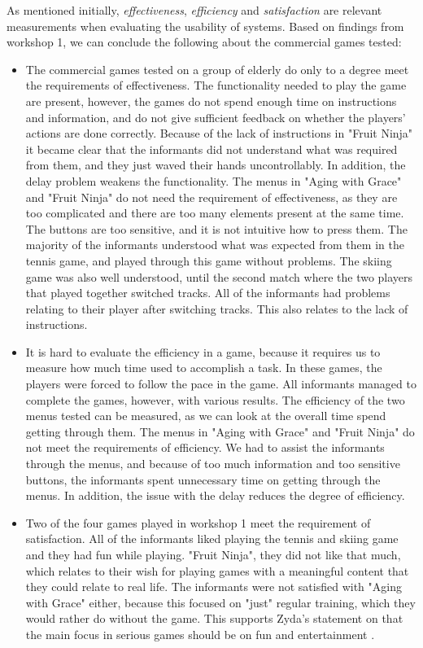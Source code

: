 As mentioned initially, \emph{effectiveness}, \emph{efficiency}  and \emph{satisfaction} are relevant measurements when evaluating the usability of systems. Based on findings from workshop 1, we can conclude the following about the commercial games tested: 
\begin{itemize}
\renewcommand{\labelitemi}{$\bullet$}
\item The commercial games tested on a group of elderly do only to a degree meet the requirements of effectiveness. The functionality needed to play the game are present, however, the games do not spend enough time on instructions and information, and do not give sufficient feedback on whether the players' actions are done correctly. Because of the lack of instructions in "Fruit Ninja" it became clear that the informants did not understand what was required from them, and they just waved their hands uncontrollably. In addition, the delay problem weakens the functionality. The menus in "Aging with Grace" and "Fruit Ninja" do not need the requirement of effectiveness, as they are too complicated and there are too many elements present at the same time. The buttons are too sensitive, and it is not intuitive how to press them. The majority of the informants understood what was expected from them in the tennis game, and played through this game without problems. The skiing game was also well understood, until the second match where the two players that played together switched tracks. All of the informants had problems relating to their player after switching tracks. This also relates to the lack of instructions.
\item It is hard to evaluate the efficiency in a game, because it requires us to measure how much time used to accomplish a task. In these games, the players were forced to follow the pace in the game. All informants managed to complete the games, however, with various results. The efficiency of the two menus tested can be measured, as we can look at the overall time spend getting through them. The menus in "Aging with Grace" and "Fruit Ninja" do not meet the requirements of efficiency. We had to assist the informants through the menus, and because of too much information and too sensitive buttons, the informants spent unnecessary time on getting through the menus. In addition, the issue with the delay reduces the degree of efficiency.
\item Two of the four games played in workshop 1 meet the requirement of satisfaction. All of the informants liked playing the tennis and skiing game and they had fun while playing. "Fruit Ninja", they did not like that much, which relates to their wish for playing games with a meaningful content that they could relate to real life. The informants were not satisfied with "Aging with Grace" either, because this focused on "just" regular training, which they would rather do without the game. This supports Zyda's statement on that the main focus in serious games should be on fun and entertainment \cite{zyda2005visual}. 
\end{itemize}

